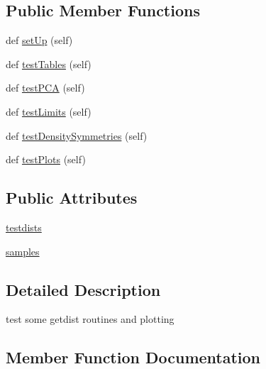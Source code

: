 \subsection*{Public Member Functions}
\begin{DoxyCompactItemize}
\item 
def \mbox{\hyperlink{classgetdist__tests_1_1getdist__test_1_1GetDistTest_adeb90d9f5aa3ea3b89934479640bca6e}{set\+Up}} (self)
\item 
def \mbox{\hyperlink{classgetdist__tests_1_1getdist__test_1_1GetDistTest_ac5751219274c73ab974ac0fb8ef73668}{test\+Tables}} (self)
\item 
def \mbox{\hyperlink{classgetdist__tests_1_1getdist__test_1_1GetDistTest_ad47c3bc6be16ee55f720091aa512801d}{test\+P\+CA}} (self)
\item 
def \mbox{\hyperlink{classgetdist__tests_1_1getdist__test_1_1GetDistTest_a878c9c0f09653935a85412676eb47e52}{test\+Limits}} (self)
\item 
def \mbox{\hyperlink{classgetdist__tests_1_1getdist__test_1_1GetDistTest_a709c5f5c64c4930382a961de30dbf78f}{test\+Density\+Symmetries}} (self)
\item 
def \mbox{\hyperlink{classgetdist__tests_1_1getdist__test_1_1GetDistTest_a9ad3a7ea7f41e8c0a15110030e716150}{test\+Plots}} (self)
\end{DoxyCompactItemize}
\subsection*{Public Attributes}
\begin{DoxyCompactItemize}
\item 
\mbox{\hyperlink{classgetdist__tests_1_1getdist__test_1_1GetDistTest_aff38f81833fe97a587b323040e6932bd}{testdists}}
\item 
\mbox{\hyperlink{classgetdist__tests_1_1getdist__test_1_1GetDistTest_a6864388831a32d9a4103cc0de5c69bf9}{samples}}
\end{DoxyCompactItemize}


\subsection{Detailed Description}
\begin{DoxyVerb}test some getdist routines and plotting\end{DoxyVerb}
 

\subsection{Member Function Documentation}
\mbox{\label{classgetdist__tests_1_1getdist__test_1_1GetDistTest_adeb90d9f5aa3ea3b89934479640bca6e}} 
